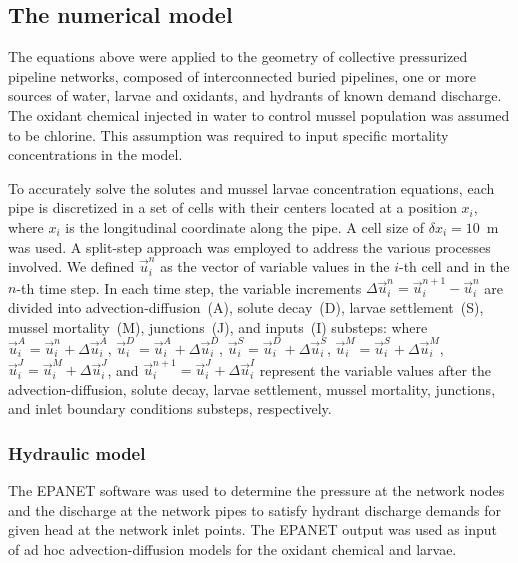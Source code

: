 \documentclass[review,authoryear]{elsarticle}
\begin{document}
\subsection{The numerical model}

The equations above were applied to the geometry of collective pressurized
pipeline networks, composed of interconnected buried pipelines, one or more
sources of water, larvae and oxidants, and hydrants of known demand discharge.
The oxidant chemical injected in water to control mussel population was assumed
to be chlorine. This assumption was required to input specific mortality
concentrations in the model.

To accurately solve the solutes and mussel larvae concentration equations,
each pipe is discretized in a set of cells with their centers located at a
position $x_i$, where $x_i$ is the longitudinal coordinate along the pipe. A
cell size of $\delta x_i=10$~m was used. A split-step approach was employed to
address the various processes involved. We defined $\vec{u}_i^n$ as the vector
of variable values in the $i$-th cell and in the $n$-th time step. In each time
step, the variable increments $\Delta\vec{u}_i^n=\vec{u}_i^{n+1}-\vec{u}_i^n$
are divided into advection-diffusion~(A), solute decay~(D),
larvae settlement~(S), mussel mortality~(M), junctions~(J), and inputs~(I)
substeps:
where $\vec{u}_i^A=\vec{u}_i^n+\Delta\vec{u}_i^A$,
$\vec{u}_i^D=\vec{u}_i^A+\Delta\vec{u}_i^D$,
$\vec{u}_i^S=\vec{u}_i^D+\Delta\vec{u}_i^S$,
$\vec{u}_i^M=\vec{u}_i^S+\Delta\vec{u}_i^M$,
$\vec{u}_i^J=\vec{u}_i^M+\Delta\vec{u}_i^J$, and
$\vec{u}_i^{n+1}=\vec{u}_i^J+\Delta\vec{u}_i^I$ represent the variable values
after the advection-diffusion, solute decay, larvae settlement, mussel
mortality, junctions, and inlet boundary conditions substeps, respectively.

\subsubsection{Hydraulic model}

The EPANET software \citep{Rossman94} was used to determine the pressure at the network nodes and the discharge at the network pipes to satisfy hydrant
discharge demands for given head at the network inlet points. The EPANET output
was used as input of ad hoc advection-diffusion models for the oxidant chemical
and larvae.
\end{document}
